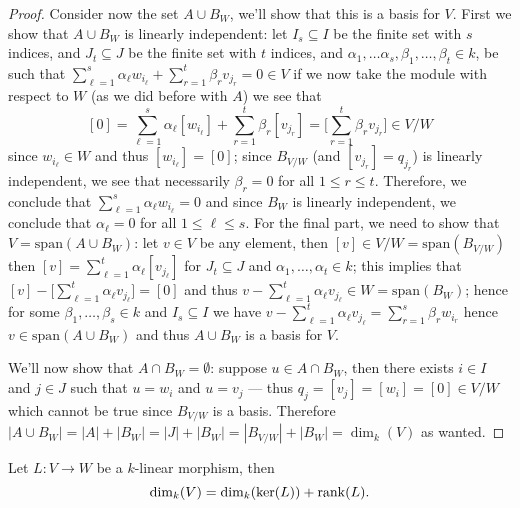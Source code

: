 \begin{proof}
    Consider now the set \(A \cup B_W\), we'll show that this is a basis for
    \(V\). First we show that \(A \cup B_W\) is linearly independent: let \(I_s
    \subseteq I\) be the finite set with \(s\) indices, and \(J_t \subseteq J\) be
    the finite set with \(t\) indices, and \(\alpha_1, \dots \alpha_s, \beta_1,
    \dots, \beta_t \in k\), be such that \(\sum_{\ell=1}^s \alpha_\ell w_{i_\ell}
    + \sum_{r=1}^t \beta_r v_{j_r} = 0 \in V\) if we now take the module with
    respect to \(W\) (as we did before with \(A\)) we see that
    \[
        [0] = \sum_{\ell=1}^s\alpha_\ell [w_{i_\ell}]
        + \sum_{r=1}^t \beta_r [v_{j_r}] = \bigg[\sum_{r=1}^t \beta_r v_{j_r}\bigg]
        \in V/W
    \]
    since \(w_{i_\ell} \in W\) and thus \([w_{i_\ell}] = [0]\); since \(B_{V/W}\)
    (and \([v_{j_r}] = q_{j_r}\)) is linearly independent, we see that
    necessarily \(\beta_r = 0\) for all \(1 \leq r \leq t\). Therefore, we
    conclude that \(\sum_{\ell=1}^s \alpha_\ell w_{i_\ell} = 0\) and since \(B_W\)
    is linearly independent, we conclude that \(\alpha_{\ell} = 0\) for all  \(1
    \leq \ell \leq s\). For the final part, we need to show that \(V =
    \mathrm{span}(A \cup B_{W})\): let \(v \in V\) be any element, then \([v] \in
    V/W = \mathrm{span}(B_{V/W})\) then \([v] = \sum_{\ell=1}^t \alpha_\ell
    [v_{j_\ell}]\) for \(J_t \subseteq J\) and \(\alpha_1, \dots, \alpha_t \in
    k\); this implies that \([v] - \big[ \sum_{\ell=1}^t \alpha_\ell v_{j_\ell}
        \big] = [0]\) and thus \(v - \sum_{\ell=1}^t \alpha_\ell v_{j_\ell} \in W =
    \mathrm{span}(B_{W})\); hence for some \(\beta_1, \dots, \beta_s \in k\) and
    \(I_s \subseteq I\) we have \(v - \sum_{\ell=1}^t \alpha_\ell v_{j_\ell} =
    \sum_{r=1}^s \beta_r w_{i_r}\) hence \(v \in \mathrm{span}(A \cup B_{W})\) and
    thus \(A \cup B_W\) is a basis for \(V\).

    We'll now show that \(A \cap B_W = \emptyset\): suppose \(u \in A \cap B_W\),
    then there exists \(i \in I\) and \(j \in J\) such that \(u = w_i\) and \(u =
    v_j\) --- thus \(q_j = [v_j] = [w_i] = [0] \in V/W\) which cannot be true since
    \(B_{V/W}\) is a basis. Therefore \(|A \cup B_W| = |A| + |B_W| = |J| + |B_W| =
    |B_{V/W}| + |B_W| = \dim_k(V)\) as wanted.
\end{proof}

\begin{theorem}\label{thm: rank plus nullity}
    Let \(L : V \to W\) be a \(k\)-linear morphism, then
    \[
        \dim_k(V) = \dim_k(\ker(L)) + \operatorname{rank}(L).
    \]
\end{theorem}

